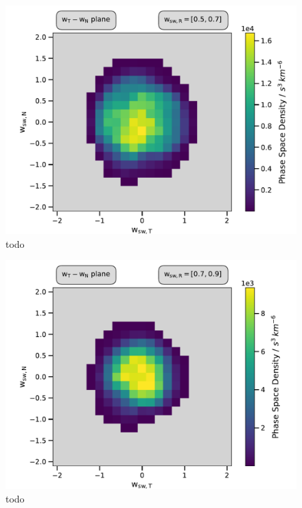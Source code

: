 \begin{figure}[h]
	\includegraphics[width=1.\textwidth]{Figures/cart_50_step1.pdf}
	\centering
	\caption{todo}
	\label{fig:todo}
\end{figure}

\begin{figure}[h]
	\includegraphics[width=1.\textwidth]{Figures/cart_50_step2.pdf}
	\centering
	\caption{todo}
	\label{fig:todo}
\end{figure}

